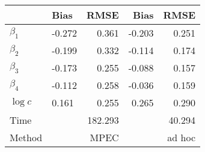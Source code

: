 
\begin{tabular}[t]{llrrr}
\toprule
  & Bias & RMSE & Bias & RMSE\\
\midrule
$\beta_{1}$ & -0.272 & 0.361 & -0.203 & 0.251\\
$\beta_{2}$ & -0.199 & 0.332 & -0.114 & 0.174\\
$\beta_{3}$ & -0.173 & 0.255 & -0.088 & 0.157\\
$\beta_{4}$ & -0.112 & 0.258 & -0.036 & 0.159\\
$\log c$ & 0.161 & 0.255 & 0.265 & 0.290\\
Time &  & 182.293 &  & 40.294\\
Method &  & MPEC &  & ad hoc\\
\bottomrule
\end{tabular}
